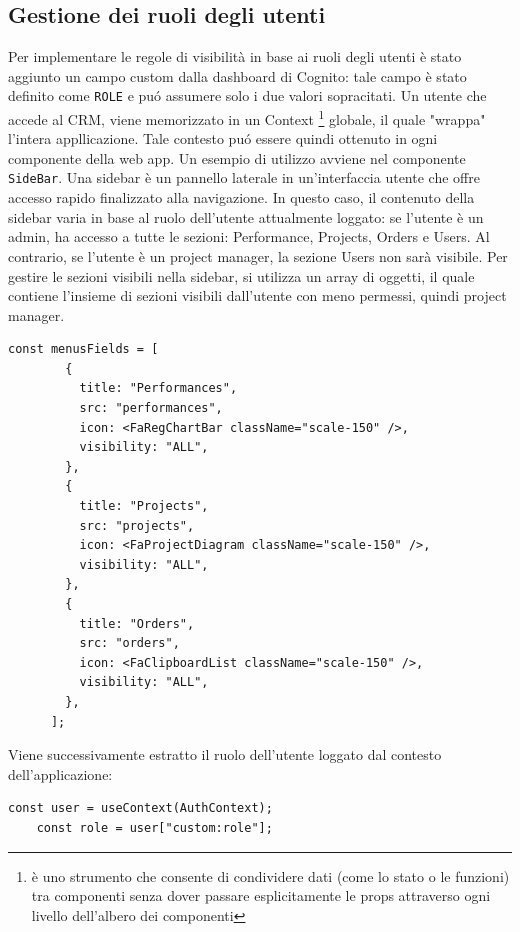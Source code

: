 \documentclass[target=bach,aauheader=,style=]{thud}
\begin{document}
\subsection{Gestione dei ruoli degli utenti}
Per implementare le regole di visibilità in base ai ruoli degli utenti è stato aggiunto un campo custom dalla dashboard di Cognito: tale campo è stato definito come \texttt{ROLE} e puó assumere solo i due valori sopracitati. Un utente che accede al CRM, viene memorizzato in un Context \footnote{è uno strumento che consente di condividere dati (come lo stato o le funzioni) tra componenti senza dover passare esplicitamente le props attraverso ogni livello dell'albero dei componenti} globale, il quale "wrappa" l'intera appllicazione. Tale contesto puó essere quindi ottenuto in ogni componente della web app. Un esempio di utilizzo avviene nel componente \texttt{SideBar}. Una sidebar è un pannello laterale in un'interfaccia utente che offre accesso rapido finalizzato alla navigazione. In questo caso, il contenuto della sidebar varia in base al ruolo dell'utente attualmente loggato: se l'utente è un admin, ha accesso a tutte le sezioni: Performance, Projects, Orders e Users. Al contrario, se l'utente è un project manager, la sezione Users non sarà visibile. Per gestire le sezioni visibili nella sidebar, si utilizza un array di oggetti, il quale contiene l'insieme di sezioni visibili dall'utente con meno permessi, quindi project manager. 

\begin{lstlisting}[caption=Campi default visibili nella sidebar]
    const menusFields = [
        {
          title: "Performances",
          src: "performances",
          icon: <FaRegChartBar className="scale-150" />,
          visibility: "ALL",
        },
        {
          title: "Projects",
          src: "projects",
          icon: <FaProjectDiagram className="scale-150" />,
          visibility: "ALL",
        },
        {
          title: "Orders",
          src: "orders",
          icon: <FaClipboardList className="scale-150" />,
          visibility: "ALL",
        },
      ];
\end{lstlisting}

\noindent Viene successivamente estratto il ruolo dell'utente loggato dal contesto dell'applicazione:

\begin{lstlisting}[caption=Parte del file \texttt{AuthenticatedLayout.tsx} del CRM]
    const user = useContext(AuthContext);
    const role = user["custom:role"];
\end{lstlisting}
\end{document}
